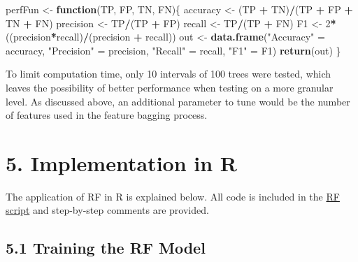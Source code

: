 \documentclass[]{article}
\newenvironment{Shaded}{\begin{snugshade}}{\end{snugshade}}
\newcommand{\ControlFlowTok}[1]{\textcolor[rgb]{0.13,0.29,0.53}{\textbf{#1}}}
\newcommand{\DecValTok}[1]{\textcolor[rgb]{0.00,0.00,0.81}{#1}}
\newcommand{\KeywordTok}[1]{\textcolor[rgb]{0.13,0.29,0.53}{\textbf{#1}}}
\newcommand{\NormalTok}[1]{#1}
\newcommand{\OperatorTok}[1]{\textcolor[rgb]{0.81,0.36,0.00}{\textbf{#1}}}
\newcommand{\StringTok}[1]{\textcolor[rgb]{0.31,0.60,0.02}{#1}}
\begin{document}
\begin{Shaded}
\begin{Highlighting}[]
\NormalTok{perfFun <-}\StringTok{ }\ControlFlowTok{function}\NormalTok{(TP, FP, TN, FN)\{}
\NormalTok{  accuracy <-}\StringTok{ }\NormalTok{(TP }\OperatorTok{+}\StringTok{ }\NormalTok{TN)}\OperatorTok{/}\NormalTok{(TP }\OperatorTok{+}\StringTok{ }\NormalTok{FP }\OperatorTok{+}\StringTok{ }\NormalTok{TN }\OperatorTok{+}\StringTok{ }\NormalTok{FN)}
\NormalTok{  precision <-}\StringTok{ }\NormalTok{TP}\OperatorTok{/}\NormalTok{(TP }\OperatorTok{+}\StringTok{ }\NormalTok{FP)}
\NormalTok{  recall <-}\StringTok{ }\NormalTok{TP}\OperatorTok{/}\NormalTok{(TP }\OperatorTok{+}\StringTok{ }\NormalTok{FN)}
\NormalTok{  F1 <-}\StringTok{ }\DecValTok{2}\OperatorTok{*}\NormalTok{((precision}\OperatorTok{*}\NormalTok{recall)}\OperatorTok{/}\NormalTok{(precision }\OperatorTok{+}\StringTok{ }\NormalTok{recall))}
\NormalTok{  out <-}\StringTok{ }\KeywordTok{data.frame}\NormalTok{(}\StringTok{"Accuracy"}\NormalTok{ =}\StringTok{ }\NormalTok{accuracy, }\StringTok{"Precision"}\NormalTok{ =}\StringTok{ }\NormalTok{precision, }\StringTok{"Recall"}\NormalTok{ =}\StringTok{ }\NormalTok{recall, }\StringTok{"F1"}\NormalTok{ =}\StringTok{ }\NormalTok{F1)}
  \KeywordTok{return}\NormalTok{(out)}
\NormalTok{\}}
\end{Highlighting}
\end{Shaded}

To limit computation time, only 10 intervals of 100 trees were tested,
which leaves the possibility of better performance when testing on a
more granular level. As discussed above, an additional parameter to tune
would be the number of features used in the feature bagging process.

\hypertarget{implementation-in-r}{%
\section{5. Implementation in R}\label{implementation-in-r}}

The application of RF in R is explained below. All code is included in
the
\href{https://github.com/NicSchuler/DSF_NFLDraftPrediction/blob/master/Project_Scripts/RandomForest.R}{RF
script} and step-by-step comments are provided.

\hypertarget{training-the-rf-model}{%
\subsection{5.1 Training the RF Model}\label{training-the-rf-model}}
\end{document}
